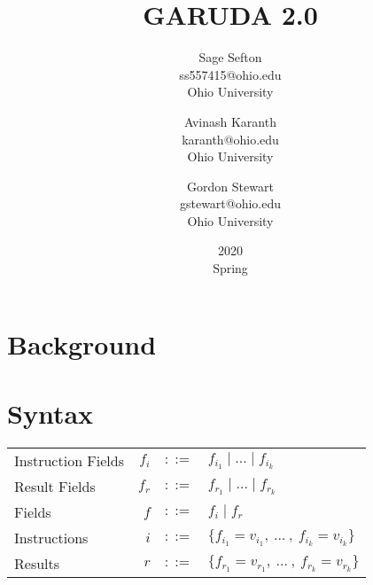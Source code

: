 \documentclass[12pt, letterpaper]{article}
\def \sysname {\textsc{GARUDA 2.0}\xspace}
\begin{document}
  \title{\sysname}
  \date{2020\\ Spring}

  \author{
    Sage Sefton \\
    ss557415@ohio.edu \\
    Ohio University \\
    \and
    Avinash Karanth  \\
    karanth@ohio.edu \\
    Ohio University  \\
    \and
    Gordon Stewart \\
    gstewart@ohio.edu \\
    Ohio University
  }

  \maketitle
  \cleardoublepage

  \section{Background}\label{sec:bkgnd}



  \section{Syntax}\label{sec:}
    \begin{tabular}{l r c l}
      Instruction Fields   & $f_{i}$   & $::=$     & $f_{i_{1}} \mid \dots \mid f_{i_{k}}$\\
      Result Fields        & $f_{r}$   & $::=$     & $f_{r_{1}} \mid \dots \mid f_{r_{k}}$\\
      Fields               & $f$       & $::=$     & $f_i \mid f_r$ \\
      Instructions         & $i$       & $::=$     & $\{f_{i_{1}} = v_{i_{1}} ,\ \dots\ ,\ f_{i_{k}} = v_{i_{k}}\}$\\
      Results              & $r$       & $::=$     & $\{f_{r_{1}} = v_{r_{1}} ,\ \dots\ ,\ f_{r_{k}} = v_{r_{k}}\}$\\
    \end{tabular}\\
\end{document}
